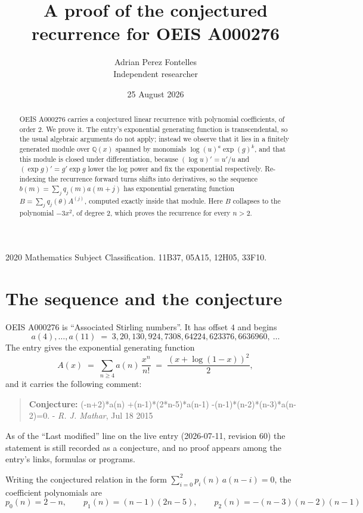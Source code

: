 \documentclass[11pt,a4paper]{article}
\title{A proof of the conjectured recurrence for OEIS A000276}
\author{Adrian Perez Fontelles\\ \small Independent researcher}
\date{25 August 2026}
\theoremstyle{plain}
\theoremstyle{definition}
\begin{document}
\maketitle

\begin{abstract}
OEIS A000276 carries a conjectured linear recurrence with polynomial coefficients, of
order 2. We prove it. The entry's exponential generating function is
transcendental, so the usual algebraic arguments do not apply; instead we observe that it
lies in a finitely generated module over $\mathbb{Q}(x)$ spanned by monomials
$\log(u)^{a}\exp(g)^{k}$, and that this module is closed under differentiation, because
$(\log u)'=u'/u$ and $(\exp g)'=g'\exp g$ lower the log power and fix the exponential
respectively. Re-indexing the recurrence forward turns shifts into derivatives, so the
sequence $b(m)=\sum_{j}q_{j}(m)a(m+j)$ has exponential generating function
$B=\sum_{j}q_{j}(\theta)A^{(j)}$, computed exactly inside that module. Here $B$ collapses
to the polynomial $- 3 x^{2}$, of degree $2$, which proves the recurrence for every
$n>2$.
\end{abstract}

\noindent\small 2020 Mathematics Subject Classification. 11B37, 05A15, 12H05, 33F10.\normalsize

\section{The sequence and the conjecture}

OEIS A000276 is ``Associated Stirling numbers''. It has offset $4$ and begins
\[
a(4),\dots,a(11)\;=\;3, 20, 130, 924, 7308, 64224, 623376, 6636960,\ \dots
\]
The entry gives the exponential generating function
\begin{equation}\label{eq:gf}
A(x)\;=\;\sum_{n\ge 4} a(n)\,\frac{x^{n}}{n!}\;=\;\frac{\left(x + \log{\left(1 - x \right)}\right)^{2}}{2} ,
\end{equation}
and it carries the following comment:
\begin{quote}\small
\textbf{Conjecture:} (-n+2)*a(n) +(n-1)*(2*n-5)*a(n-1) -(n-1)*(n-2)*(n-3)*a(n-2)=0. - \emph{R. J. Mathar}, Jul 18 2015
\end{quote}
As of the ``Last modified'' line on the live entry (2026-07-11, revision 60) the
statement is still recorded as a conjecture, and no proof appears among the entry's links,
formulas or programs.

Writing the conjectured relation in the form $\sum_{i=0}^{2}p_{i}(n)\,a(n-i)=0$,
the coefficient polynomials are
\[
p_{0}(n)=2 - n,\qquad p_{1}(n)=\left(n - 1\right) \left(2 n - 5\right),\qquad p_{2}(n)=- \left(n - 3\right) \left(n - 2\right) \left(n - 1\right)
\]
\end{document}
